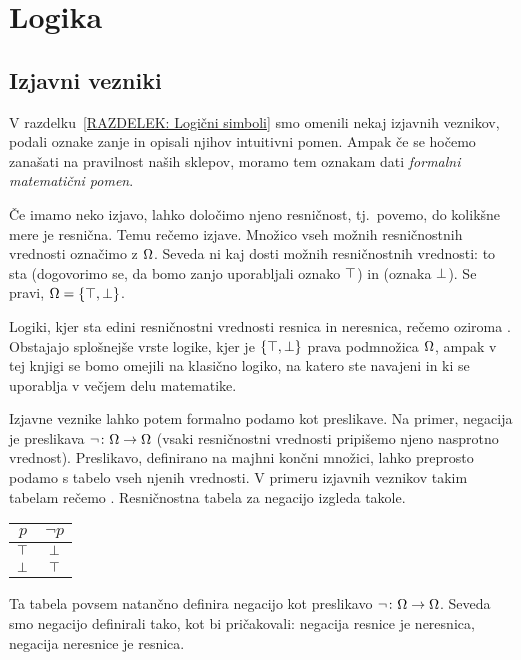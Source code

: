 \chapter{Logika}\label{POGLAVJE: Logika}

	
	
	\section{Izjavni vezniki}
	
		V razdelku~\ref{RAZDELEK: Logični simboli} smo omenili nekaj izjavnih veznikov, podali oznake zanje in opisali njihov intuitivni pomen. Ampak če se hočemo zanašati na pravilnost naših sklepov, moramo tem oznakam dati \emph{formalni matematični pomen}.
		
		Če imamo neko izjavo, lahko določimo njeno resničnost, tj.~povemo, do kolikšne mere je resnična. Temu rečemo  izjave. Množico vseh možnih resničnostnih vrednosti označimo z $\Omega$. Seveda ni kaj dosti možnih resničnostnih vrednosti: to sta  (dogovorimo se, da bomo zanjo uporabljali oznako $\top$) in  (oznaka $\bot$). Se pravi, $\tvs = \set{\true, \false}$.
		
		\begin{opomba}
			Logiki, kjer sta edini resničnostni vrednosti resnica in neresnica, rečemo  oziroma . Obstajajo splošnejše vrste logike, kjer je $\set{\true, \false}$ prava podmnožica $\Omega$, ampak v tej knjigi se bomo omejili na klasično logiko, na katero ste navajeni in ki se uporablja v večjem delu matematike.
		\end{opomba}
		
		
		Izjavne veznike lahko potem formalno podamo kot preslikave. Na primer, negacija je preslikava $\lnot\colon \Omega \to \Omega$ (vsaki resničnostni vrednosti pripišemo njeno nasprotno vrednost). Preslikavo, definirano na majhni končni množici, lahko preprosto podamo s tabelo vseh njenih vrednosti. V primeru izjavnih veznikov takim tabelam rečemo . Resničnostna tabela za negacijo izgleda takole.
		\begin{center}
			\begin{tabular}{c|c}
				$p$ & $\lnot{p}$ \\
				\hline
				$\top$ & $\bot$ \\
				$\bot$ & $\top$
			\end{tabular}
		\end{center}
		Ta tabela povsem natančno definira negacijo kot preslikavo $\lnot\colon \Omega \to \Omega$. Seveda smo negacijo definirali tako, kot bi pričakovali: negacija resnice je neresnica, negacija neresnice je resnica.
		
